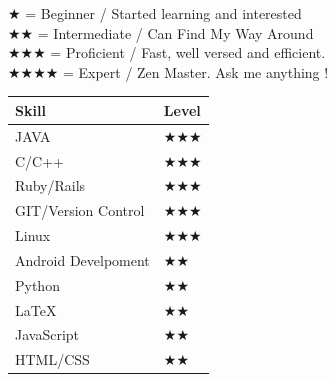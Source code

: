 \documentclass{article}
\begin{document}
		\begin{center}
			$\bigstar$ = Beginner / Started learning and interested\\
			$\bigstar$$\bigstar$ = Intermediate / Can Find My Way Around\\
			$\bigstar$$\bigstar$$\bigstar$ = Proficient / Fast, well versed and efficient. \\
			$\bigstar$$\bigstar$$\bigstar$$\bigstar$ = Expert / Zen Master. Ask me anything !\\
		\end{center}
		\begin{center}
		    \begin{tabular}{ | p{4cm}  p{3cm} |}
		    \hline
		    \textbf{Skill} & \textbf{Level}\\ \hline
		    JAVA & $\bigstar$$\bigstar$$\bigstar$\\
		    C/C++ & $\bigstar$$\bigstar$$\bigstar$\\
		    Ruby/Rails & $\bigstar$$\bigstar$$\bigstar$\\
		    GIT/Version Control & $\bigstar$$\bigstar$$\bigstar$\\
		    Linux & $\bigstar$$\bigstar$$\bigstar$\\
		    Android Develpoment & $\bigstar$$\bigstar$\\
		    Python & $\bigstar$$\bigstar$\\
		    \LaTeX & $\bigstar$$\bigstar$\\
		    JavaScript & $\bigstar$$\bigstar$\\
		  	HTML/CSS & $\bigstar$$\bigstar$\\
		    \hline
		    \end{tabular}
		\end{center}
		
\end{document}
